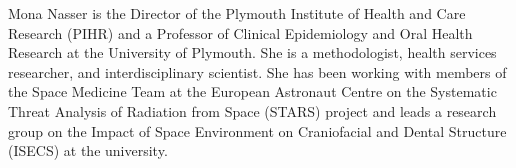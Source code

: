 \documentclass[a4paper,parskip,10pt]{scrartcl}
\begin{document}
\begin{tcolorbox}
        {
            \small
            \color{white!20!black}
            Mona Nasser is the Director of the Plymouth Institute of Health and Care Research (PIHR) and a Professor of Clinical Epidemiology and Oral Health Research at the University of Plymouth. She is a methodologist, health services researcher, and interdisciplinary scientist. She has been working with members of the Space Medicine Team at the European Astronaut Centre on the Systematic Threat Analysis of Radiation from Space (STARS) project and leads a research group on the Impact of Space Environment on Craniofacial and Dental Structure (ISECS) at the university.}

        

        \vspace{2ex}
    \end{tcolorbox}
    \vspace{-1ex}



\vfill

\begin{tcolorbox}[
    width=\paperwidth,center,boxrule=0pt,arc=0pt,auto outer arc,colframe=white,colback=white,valign=center]
    \hfill
    \hfill
    \hfill
    \hfill
    \hfill
    \hfill
    \hfill
\end{tcolorbox}

\vspace{1cm}

    
\end{document}
